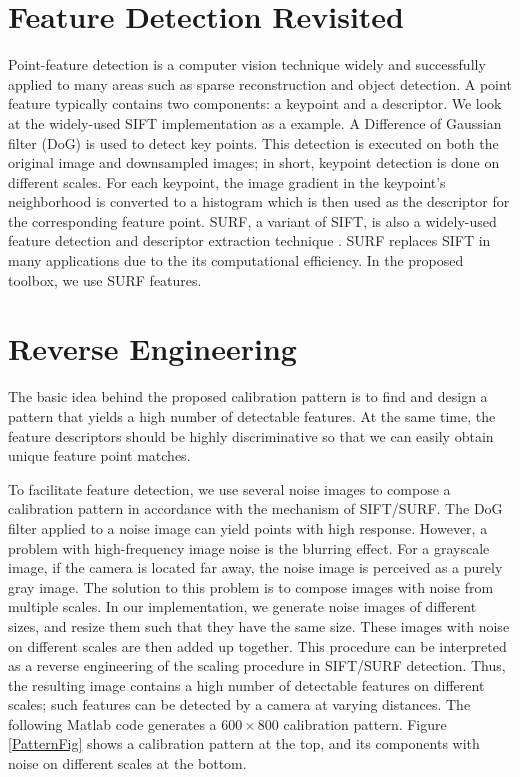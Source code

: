 \documentclass{report}
\begin{document}
\label{PatternSec}
\section{Feature Detection Revisited}

Point-feature detection is a computer vision technique widely and successfully applied to many areas such as sparse reconstruction and object detection. A point feature typically contains two components: a keypoint and a descriptor. We look at the widely-used SIFT implementation \cite{lowe2004distinctive} as a example. A Difference of Gaussian filter (DoG) is used to detect key points. This detection is executed on both the original image and downsampled images; in short, keypoint detection is done on different scales. For each keypoint, the image gradient in the keypoint's neighborhood is converted to a histogram which is then used as the descriptor for the corresponding feature point. SURF, a variant of SIFT, is also a widely-used feature detection and descriptor extraction technique \cite{bay2006surf}. SURF replaces SIFT in many applications due to the its computational efficiency. In the proposed toolbox, we use SURF features. 

\section{Reverse Engineering}
The basic idea behind the proposed calibration pattern is to find and design a pattern that yields a high number of detectable features. At the same time, the feature descriptors should be highly discriminative so that we can easily obtain unique feature point matches. 

To facilitate feature detection, we use several noise images to compose a calibration pattern in accordance with the mechanism of SIFT/SURF. The DoG filter applied to a noise image can yield points with high response. However, a problem with high-frequency image noise is the blurring effect. For a grayscale image, if the camera is located far away, the noise image is perceived as a purely gray image. The solution to this problem is to compose images with noise from multiple scales. In our implementation, we generate noise images of different sizes, and resize them such that they have the same size. These images with noise on different scales are then added up together. This procedure can be interpreted as a reverse engineering of the scaling procedure in SIFT/SURF detection. Thus, the resulting image contains a high number of detectable features on different scales; such features can be detected by a camera at varying distances. The following Matlab code generates a $600 \times 800$ calibration pattern. Figure \ref{PatternFig} shows a calibration pattern at the top, and its components with noise on different scales at the bottom. 
\end{document}
